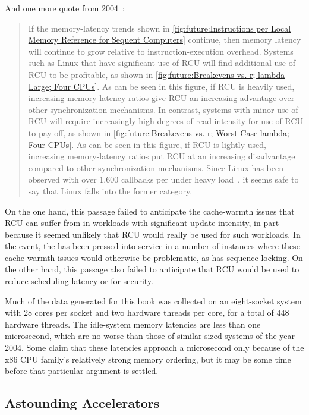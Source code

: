 And one more quote from 2004~\cite{PaulEdwardMcKenneyPhD}:

\begin{quote}
	If the memory-latency trends shown in
	\cref{fig:future:Instructions per Local Memory Reference for Sequent Computers}
	continue, then memory latency will continue to grow relative
	to instruction-execution overhead.
	Systems such as Linux that have significant use of RCU will find
	additional use of RCU to be profitable, as shown in
	\cref{fig:future:Breakevens vs. r; lambda Large; Four CPUs}.
	As can be seen in this figure, if RCU is heavily used, increasing
	memory-latency ratios give RCU an increasing advantage over other
	synchronization mechanisms.
	In contrast, systems with minor
	use of RCU will require increasingly high degrees of read intensity
	for use of RCU to pay off, as shown in
	\cref{fig:future:Breakevens vs. r; Worst-Case lambda; Four CPUs}.
	As can be seen in this figure, if RCU is lightly used,
	increasing memory-latency ratios
	put RCU at an increasing disadvantage compared to other synchronization
	mechanisms.
	Since Linux has been observed with over 1,600 callbacks per  under heavy load~\cite{Sarma04c},
	it seems safe to say that Linux falls into the former category.
\end{quote}

On the one hand, this passage failed to anticipate the cache-warmth
issues that RCU can suffer from in workloads with significant update
intensity, in part because it seemed unlikely that RCU would really
be used for such workloads.
In the event, the  has been pressed into
service in a number of instances where these cache-warmth issues would
otherwise be problematic, as has sequence locking.
On the other hand, this passage also failed to anticipate that
RCU would be used to reduce scheduling latency or for security.

Much of the data generated for this book was collected on an eight-socket
system with 28 cores per socket and two hardware threads per core, for
a total of 448 hardware threads.
The idle-system memory latencies are less than one microsecond, which
are no worse than those of similar-sized systems of the year 2004.
Some claim that these latencies approach a microsecond only because of
the x86 CPU family's relatively strong memory ordering, but it may be
some time before that particular argument is settled.

\subsection{Astounding Accelerators}
\label{sec:future:Astounding Accelerators}

